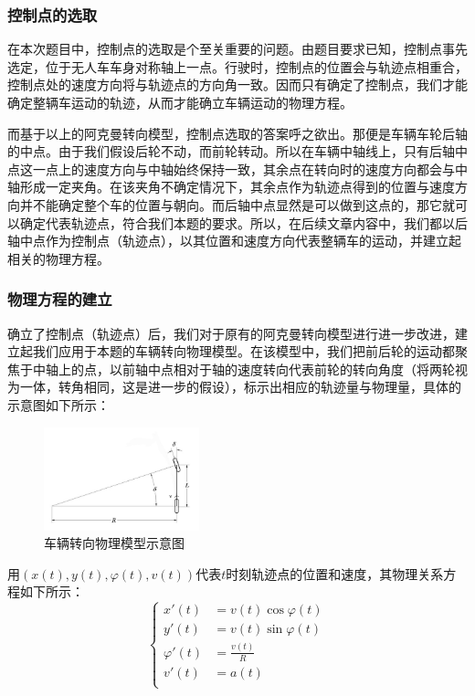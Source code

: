 \documentclass{article}
\begin{document}
    \subsubsection{控制点的选取}
    在本次题目中，控制点的选取是个至关重要的问题。由题目要求已知，控制点事先选定，位于无人车车身对称轴上一点。行驶时，控制点的位置会与轨迹点相重合，控制点处的速度方向将与轨迹点的方向角一致。因而只有确定了控制点，我们才能确定整辆车运动的轨迹，从而才能确立车辆运动的物理方程。
    
    而基于以上的阿克曼转向模型，控制点选取的答案呼之欲出。那便是车辆车轮后轴的中点。由于我们假设后轮不动，而前轮转动。所以在车辆中轴线上，只有后轴中点这一点上的速度方向与中轴始终保持一致，其余点在转向时的速度方向都会与中轴形成一定夹角。在该夹角不确定情况下，其余点作为轨迹点得到的位置与速度方向并不能确定整个车的位置与朝向。而后轴中点显然是可以做到这点的，那它就可以确定代表轨迹点，符合我们本题的要求。所以，在后续文章内容中，我们都以后轴中点作为控制点（轨迹点），以其位置和速度方向代表整辆车的运动，并建立起相关的物理方程。
    
    \subsubsection{物理方程的建立}
    确立了控制点（轨迹点）后，我们对于原有的阿克曼转向模型进行进一步改进，建立起我们应用于本题的车辆转向物理模型。在该模型中，我们把前后轮的运动都聚焦于中轴上的点，以前轴中点相对于轴的速度转向代表前轮的转向角度（将两轮视为一体，转角相同，这是进一步的假设），标示出相应的轨迹量与物理量，具体的示意图如下所示：
   \begin{figure}[!h]
    	\centering 
    	\includegraphics[width=0.4\textwidth]{车辆转向物理模型示意图.jpg}	
    	\caption{车辆转向物理模型示意图}
    \end{figure}

    用$(x(t),y(t),\varphi(t),v(t))$代表$t$时刻轨迹点的位置和速度，其物理关系方程如下所示：
	\begin{equation}
		\left\{
		\begin{aligned}
			x'(t)&=v(t)\cos\varphi(t)\\
			y'(t)&=v(t)\sin\varphi(t)\\
			\varphi'(t)&=\frac{v(t)}{R}\\
			v'(t)&=a(t)\\
		\end{aligned}
		\right.
	\end{equation}
    
\end{document}

